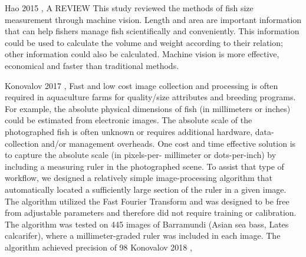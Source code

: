 Hao 2015 \cite{Hao2015TheMO}, A REVIEW
This study reviewed the methods of fish size measurement through machine vision. Length and area are important information that can help fishers manage fish scientifically and conveniently. This information could be used to calculate the volume and weight according to their relation; other information could also be calculated. Machine vision is more effective, economical and faster than traditional methods.

Konovalov 2017 \cite{KonovalovD2017RDfA},
Fast and low cost image collection and processing is often required in aquaculture farms for quality/size attributes and breeding programs. For example, the absolute physical dimensions of fish (in millimeters or inches) could be estimated from electronic images. The absolute scale of the photographed fish is often unknown or requires additional hardware, data- collection and/or management overheads. One cost and time effective solution is to capture the absolute scale (in pixels-per- millimeter or dots-per-inch) by including a measuring ruler in the photographed scene. To assist that type of workflow, we designed a relatively simple image-processing algorithm that automatically located a sufficiently large section of the ruler in a given image. The algorithm utilized the Fast Fourier Transform and was designed to be free from adjustable parameters and therefore did not require training or calibration. The algorithm was tested on 445 images of Barramundi (Asian sea bass, Lates calcarifer), where a millimeter-graded ruler was included in each image. The algorithm achieved precision of 98%
Konovalov 2018 \cite{Konovalov2018AutomaticSO},
